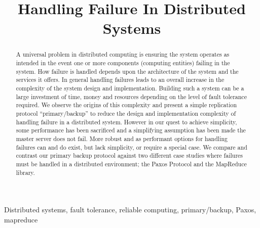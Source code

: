 \documentclass[conference]{IEEEtran}
\begin{document}
\title{Handling Failure In Distributed Systems\\
}

\author{

}






\maketitle

\begin{abstract}
A universal problem in distributed computing is ensuring the system operates as intended in the event one or more components (computing entities) failing in the system. How failure is handled depends upon the architecture of the system and the services it offers. In general handling failures leads to an overall increase in the complexity of the system design and implementation. Building such a system can be a large investment of time, money and resources depending on the level of fault tolerance required. We observe the origins of this complexity and present a simple replication protocol “primary/backup” to reduce the design and implementation complexity of handling failure in a distributed system. However in our quest to achieve simplicity, some performance has been sacrificed and a simplifying assumption has been made the master server does not fail. More robust and as performant options for handling failures can and do exist, but lack simplicity, or require a special case. We compare and contrast our primary backup protocol against two different case studies where failures must be handled in a distributed environment; the Paxos Protocol and the MapReduce library. 
\end{abstract}

\begin{IEEEkeywords}
Distributed systems, fault tolerance, reliable computing, primary/backup, Paxos, mapreduce
\end{IEEEkeywords}
\end{document}
